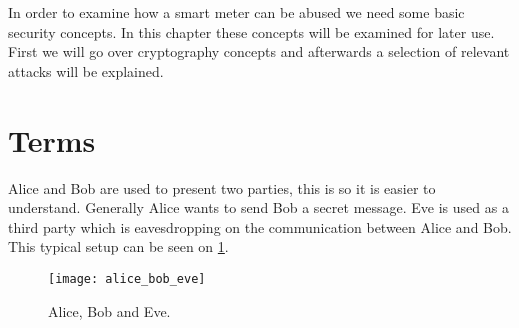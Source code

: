 
In order to examine how a smart meter can be abused we need some basic security concepts.
In this chapter these concepts will be examined for later use.
First we will go over cryptography concepts and afterwards a selection of relevant attacks will be explained.

\section{Terms}
Alice and Bob are used to present two parties, this is so it is easier to understand.
Generally Alice wants to send Bob a secret message.
Eve is used as a third party which is eavesdropping on the communication between Alice and Bob.
This typical setup can be seen on \cref{alice_bob_eve}.

\begin{figure}[H]
  \begin{center}
    \texttt{[image: alice\_bob\_eve]}
  \end{center}
  \caption[wat]{Alice, Bob and Eve.\footnotemark}
  \label{alice_bob_eve}
\end{figure}
